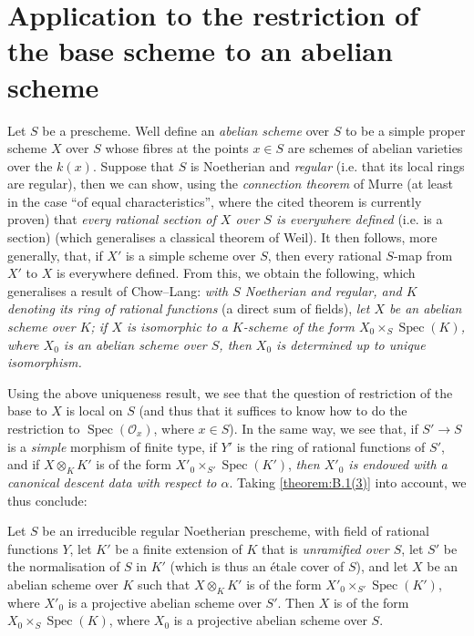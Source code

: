 \documentclass{article}
\theoremstyle{plain}
\newenvironment{proposition}[1]
  {\renewcommand\theinnercustomproposition{#1}\innercustomproposition}
  {\endinnercustomproposition}
\theoremstyle{definition}
\newcommand{\sh}[1]{{\mathscr{#1}}}
\newcommand{\kres}{k}
\DeclareMathOperator{\Spec}{Spec}
\newcommand{\oldpage}[1]{\marginpar{\footnotesize$\Big\vert$ \textit{p.~#1}}}
\begin{document}
\section{Application to the restriction of the base scheme to an abelian scheme}
\label{B.5}

Let $S$ be a prescheme.
Well define an \emph{abelian scheme} over $S$ to be a simple proper scheme $X$
\oldpage{190-26}
over $S$ whose fibres at the points $x\in S$ are schemes of abelian varieties over the $\kres(x)$.
Suppose that $S$ is Noetherian and \emph{regular} (i.e. that its local rings are regular), then we can show, using the \emph{connection theorem} of Murre \cite{4} (at least in the case ``of equal characteristics'', where the cited theorem is currently proven) that \emph{every rational section of $X$ over $S$ is everywhere defined} (i.e. is a section) (which generalises a classical theorem of Weil).
It then follows, more generally, that, if $X'$ is a simple scheme over $S$, then every rational $S$-map from $X'$ to $X$ is everywhere defined.
From this, we obtain the following, which generalises a result of Chow--Lang:
\emph{with $S$ Noetherian and regular, and $K$ denoting its ring of rational functions} (a direct sum of fields), \emph{let $X$ be an abelian scheme over $K$; if $X$ is isomorphic to a $K$-scheme of the form $X_0\times_S\Spec(K)$, where $X_0$ is an abelian scheme over $S$, then $X_0$ is determined up to unique isomorphism.}

Using the above uniqueness result, we see that the question of restriction of the base to $X$ is local on $S$ (and thus that it suffices to know how to do the restriction to $\Spec(\sh{O}_x)$, where $x\in S$).
In the same way, we see that, if $S'\to S$ is a \emph{simple} morphism of finite type, if $Y'$ is the ring of rational functions of $S'$, and if $X\otimes_K K'$ is of the form $X'_0\times_{S'}\Spec(K')$, \emph{then $X'_0$ is endowed with a canonical descent data with respect to $\alpha$}.
Taking \cref{theorem:B.1(3)} into account, we thus conclude:

\begin{proposition}{5.1}
  Let $S$ be an irreducible regular Noetherian prescheme, with field of rational functions $Y$, let $K'$ be a finite extension of $K$ that is \emph{unramified over $S$}, let $S'$ be the normalisation of $S$ in $K'$ (which is thus an \'{e}tale cover of $S$), and let $X$ be an abelian scheme over $K$ such that $X\otimes_K K'$ is of the form $X'_0\times_{S'}\Spec(K')$, where $X'_0$ is a projective abelian scheme over $S'$.
  Then $X$ is of the form $X_0\times_S\Spec(K)$, where $X_0$ is a projective abelian scheme over $S$.
\end{proposition}
\end{document}
